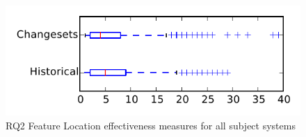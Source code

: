
\begin{figure}
\centering
\includegraphics[height=0.4\textheight]{figures/flt/rq2_tiny}
\caption{RQ2 Feature Location effectiveness measures for all subject systems}
\label{fig:flt:rq2:tiny}
\end{figure}
